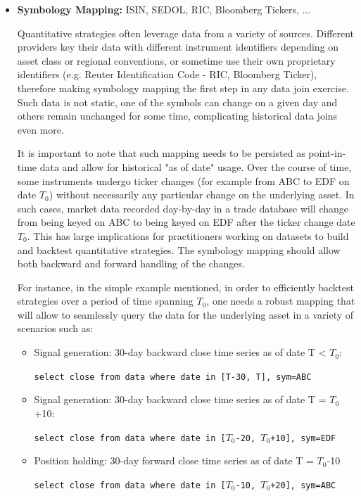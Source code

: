 \begin{itemize}
\item \textbf{Symbology Mapping:} ISIN, SEDOL, RIC, Bloomberg Tickers, ... 

Quantitative strategies often leverage data from a variety of sources. Different providers key their data with different instrument identifiers depending on asset class or regional conventions, or sometime use their own proprietary identifiers (e.g. Reuter Identification Code - RIC, Bloomberg Ticker), therefore making symbology mapping the first step in any data join exercise. Such data is not static, one of the symbols can change on a given day and others remain unchanged for some time, complicating historical data joins even more.

It is important to note that such mapping needs to be persisted as point-in-time data and allow for historical "as of date" usage. Over the course of time, some instruments undergo ticker changes (for example from ABC to EDF on date $T_0$) without necessarily any particular change on the underlying asset. In such cases, market data recorded day-by-day in a trade database will change from being keyed on ABC to being keyed on EDF after the ticker change date $T_0$. This has large implications for practitioners working on datasets to build and backtest quantitative strategies. The symbology mapping should allow both backward and forward handling of the changes.

For instance, in the simple example mentioned, in order to efficiently backtest strategies over a period of time spanning $T_0$, one needs a robust mapping that will allow to seamlessly query the data for the underlying asset in a variety of scenarios such as:

\begin{itemize}
\item Signal generation: 30-day backward close time series as of date T < $T_0$:

{\tt select close from data where date in [T-30,  T], sym=ABC}

\item Signal generation: 30-day backward close time series as of date T = $T_0$+10:

{\tt select close from data where date in [$T_0$-20,  $T_0$+10], sym=EDF}

\item Position holding: 30-day forward close time series as of date T = $T_0$-10

{\tt select close from data where date in [$T_0$-10,  $T_0$+20], sym=ABC}


\end{itemize}
\end{itemize}
